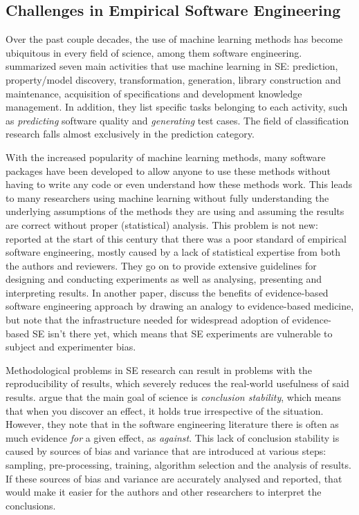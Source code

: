 \documentclass[a4paper]{article}
\begin{document}
\subsection{Challenges in Empirical Software Engineering}
Over the past couple decades, the use of machine learning methods has become ubiquitous in every field of science, among them software engineering. \textcite{Zhang2002} summarized seven main activities that use machine learning in SE: prediction, property/model discovery, transformation, generation, library construction and maintenance, acquisition of specifications and development knowledge management. In addition, they list specific tasks belonging to each activity, such as \textit{predicting} software quality and \textit{generating} test cases. The field of classification research falls almost exclusively in the prediction category.

With the increased popularity of machine learning methods, many software packages have been developed to allow anyone to use these methods without having to write any code or even understand how these methods work. This leads to many researchers using machine learning without fully understanding the underlying assumptions of the methods they are using and assuming the results are correct without proper (statistical) analysis. This problem is not new: \textcite{kitchenham2002} reported at the start of this century that there was a poor standard of empirical software engineering, mostly caused by a lack of statistical expertise from both the authors and reviewers. They go on to provide extensive guidelines for designing and conducting experiments as well as analysing, presenting and interpreting results. In another paper, \textcite{kitchenham2004} discuss the benefits of evidence-based software engineering approach by drawing an analogy to evidence-based medicine, but note that the infrastructure needed for widespread adoption of evidence-based SE isn't there yet, which means that SE experiments are vulnerable to subject and experimenter bias. 

Methodological problems in SE research can result in problems with the reproducibility of results, which severely reduces the real-world usefulness of said results. \textcite{Menzies2012} argue that the main goal of science is \textit{conclusion stability}, which means that when you discover an effect, it holds true irrespective of the situation. However, they note that in the software engineering literature there is often as much evidence \textit{for} a given effect, as \textit{against}. This lack of conclusion stability is caused by sources of bias and variance that are introduced at various steps: sampling, pre-processing, training, algorithm selection and the analysis of results. If these sources of bias and variance are accurately analysed and reported, that would make it easier for the authors and other researchers to interpret the conclusions.
\end{document}
